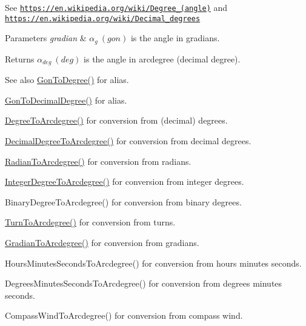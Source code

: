 See \href{https://en.wikipedia.org/wiki/Degree_(angle)}{\tt https\+://en.\+wikipedia.\+org/wiki/\+Degree\+\_\+(angle)} and \href{https://en.wikipedia.org/wiki/Decimal_degrees}{\tt https\+://en.\+wikipedia.\+org/wiki/\+Decimal\+\_\+degrees} 
\begin{DoxyParams}{Parameters}
{\em gradian} & $\alpha_{g}\ (gon)$ is the angle in gradians. \\
\hline
\end{DoxyParams}
\begin{DoxyReturn}{Returns}
$\alpha_{deg}\ (deg)$ is the angle in arcdegree (decimal degree). 
\end{DoxyReturn}
\begin{DoxySeeAlso}{See also}
\mbox{\hyperlink{group___e_g_x_math-_angle_conversions-_gon_gaf1c40076eaf3be4e070ff34045db55d1}{Gon\+To\+Degree()}} for alias. 

\mbox{\hyperlink{group___e_g_x_math-_angle_conversions-_gon_ga737e654bac7b6aa9c18f73b1b83e0605}{Gon\+To\+Decimal\+Degree()}} for alias. 

\mbox{\hyperlink{group___e_g_x_math-_angle_conversions-_degree_gac1b5f3b68f66c77a6df4ceef842c9b19}{Degree\+To\+Arcdegree()}} for conversion from (decimal) degrees. 

\mbox{\hyperlink{group___e_g_x_math-_angle_conversions-_decimal_degree_gacdd463fcabffeb598ebda65b012ce743}{Decimal\+Degree\+To\+Arcdegree()}} for conversion from decimal degrees. 

\mbox{\hyperlink{group___e_g_x_math-_angle_conversions-_radian_ga3dfdc97357cc07f8379976bbc08f9852}{Radian\+To\+Arcdegree()}} for conversion from radians. 

\mbox{\hyperlink{group___e_g_x_math-_angle_conversions-_integer_degree_gaf633d0b82bfb7586ce86ffbcf78d8f7a}{Integer\+Degree\+To\+Arcdegree()}} for conversion from integer degrees. 

Binary\+Degree\+To\+Arcdegree() for conversion from binary degrees. 

\mbox{\hyperlink{group___e_g_x_math-_angle_conversions-_turn_ga7bdc3a81ce316dd47b1a3179489fa195}{Turn\+To\+Arcdegree()}} for conversion from turns. 

\mbox{\hyperlink{group___e_g_x_math-_angle_conversions-_gradian_gacd0b1797f2460944dcbc541a855ec21c}{Gradian\+To\+Arcdegree()}} for conversion from gradians. 

Hours\+Minutes\+Seconds\+To\+Arcdegree() for conversion from hours minutes seconds. 

Degrees\+Minutes\+Seconds\+To\+Arcdegree() for conversion from degrees minutes seconds. 

Compass\+Wind\+To\+Arcdegree() for conversion from compass wind. 
\end{DoxySeeAlso}
\mbox{\label{group___e_g_x_math-_angle_conversions-_gon_ga02679f6b0f3520ede1db642aadb51383}} 
